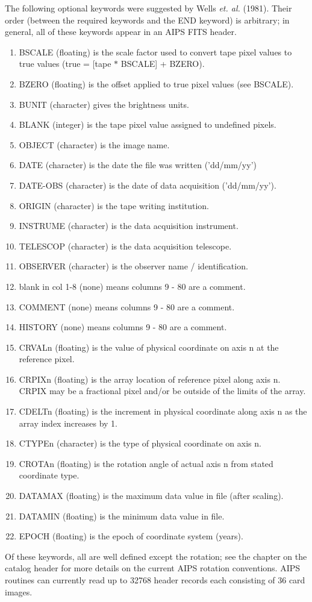 The following optional keywords were suggested by Wells {\it et. al.}
(1981). Their order (between the required keywords and the END
keyword) is arbitrary; in general, all of these keywords appear in an
AIPS FITS header.
\begin{enumerate} %
\item BSCALE (floating) is the scale factor used to convert tape pixel
values to true values (true = [tape $\ast$ BSCALE] + BZERO).
\item BZERO (floating) is the offset applied to true pixel values (see
BSCALE).
\item BUNIT (character) gives the brightness units.
\item BLANK (integer) is the tape pixel value assigned to undefined pixels.
\item OBJECT (character) is the image name.
\item DATE (character) is the date the file was written ('dd/mm/yy')
\item DATE-OBS (character) is the  date of data acquisition ('dd/mm/yy').
\item ORIGIN (character) is the tape writing institution.
\item INSTRUME (character) is the  data acquisition instrument.
\item TELESCOP (character) is the  data acquisition telescope.
\item OBSERVER (character) is the  observer name / identification.
\item blank in col 1-8 (none) means columns 9 - 80 are a comment.
\item COMMENT (none) means columns 9 - 80 are a comment.
\item HISTORY (none) means columns 9 - 80 are a comment.
\item CRVALn (floating) is the value of physical coordinate on axis n at the
reference pixel.
\item CRPIXn (floating) is the array location of reference pixel along axis
n. CRPIX may be a fractional pixel and/or be outside of the limits of
the array.
\item CDELTn (floating) is the increment in physical coordinate along axis n
as the array index increases by 1.
\item CTYPEn (character) is the type of physical coordinate on axis n.
\item CROTAn (floating) is the rotation angle of actual axis n from stated
coordinate type.
\item DATAMAX (floating) is the  maximum data value in file (after scaling).
\item DATAMIN (floating) is the minimum data value in file.
\item EPOCH (floating) is the epoch of coordinate system (years).
\end{enumerate} %
Of these keywords, all are well defined except the rotation;  see the
chapter on the catalog header for more details on the current AIPS
rotation conventions.  AIPS routines can currently read up to 32768
header records each consisting of 36 card images.

